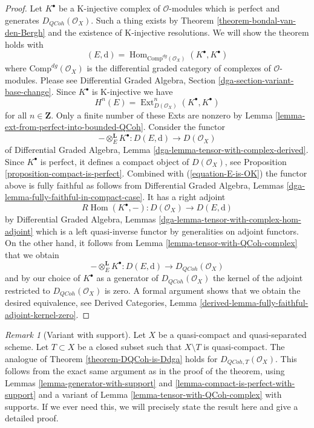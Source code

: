 \documentclass{stacks-project}
\theoremstyle{plain}
\theoremstyle{definition}
\theoremstyle{remark}
\newtheorem{remark}[subsection]{Remark}
\numberwithin{equation}{subsection}
\def\Hom{\mathop{\mathrm{Hom}}\nolimits}
\def\Ext{\mathop{\mathrm{Ext}}\nolimits}
\def\QCoh{\mathit{QCoh}}
\begin{document}
\begin{proof}
Let $K^\bullet$ be a K-injective complex of $\mathcal{O}$-modules which
is perfect and generates $D_\QCoh(\mathcal{O}_X)$. Such a
thing exists by Theorem \ref{theorem-bondal-van-den-Bergh}
and the existence of K-injective resolutions. We will show the
theorem holds with
$$
(E, \text{d}) = \Hom_{\text{Comp}^{dg}(\mathcal{O}_X)}(K^\bullet, K^\bullet)
$$
where $\text{Comp}^{dg}(\mathcal{O}_X)$ is the differential graded category
of complexes of $\mathcal{O}$-modules. Please see
Differential Graded Algebra, Section \ref{dga-section-variant-base-change}.
Since $K^\bullet$ is K-injective we
have
\begin{equation}
\label{equation-E-is-OK}
H^n(E) = \Ext^n_{D(\mathcal{O}_X)}(K^\bullet, K^\bullet)
\end{equation}
for all $n \in \mathbf{Z}$. Only a finite number of these Exts
are nonzero by Lemma \ref{lemma-ext-from-perfect-into-bounded-QCoh}.
Consider the functor
$$
- \otimes_E^\mathbf{L} K^\bullet :
D(E, \text{d}) \longrightarrow D(\mathcal{O}_X)
$$
of
Differential Graded Algebra, Lemma
\ref{dga-lemma-tensor-with-complex-derived}.
Since $K^\bullet$ is perfect, it defines a compact object of
$D(\mathcal{O}_X)$, see Proposition \ref{proposition-compact-is-perfect}.
Combined with (\ref{equation-E-is-OK}) the functor above is fully
faithful as follows from
Differential Graded Algebra, Lemmas
\ref{dga-lemma-fully-faithful-in-compact-case}. It has a right adjoint
$$
R\Hom(K^\bullet, - ) : D(\mathcal{O}_X) \longrightarrow D(E, \text{d})
$$
by Differential Graded Algebra, Lemmas
\ref{dga-lemma-tensor-with-complex-hom-adjoint}
which is a left quasi-inverse functor by generalities on adjoint
functors. On the other hand, it follows from
Lemma \ref{lemma-tensor-with-QCoh-complex} that we obtain
$$
- \otimes_E^\mathbf{L} K^\bullet :
D(E, \text{d}) \longrightarrow D_\QCoh(\mathcal{O}_X)
$$
and by our choice of $K^\bullet$ as a generator of
$D_\QCoh(\mathcal{O}_X)$ the kernel of the adjoint
restricted to $D_\QCoh(\mathcal{O}_X)$ is zero.
A formal argument shows that we obtain the desired equivalence, see
Derived Categories, Lemma
\ref{derived-lemma-fully-faithful-adjoint-kernel-zero}.
\end{proof}

\begin{remark}[Variant with support]
\label{remark-DQCoh-is-Ddga-with-support}
Let $X$ be a quasi-compact and quasi-separated scheme. Let $T \subset X$
be a closed subset such that $X \setminus T$ is quasi-compact.
The analogue of Theorem \ref{theorem-DQCoh-is-Ddga} holds
for $D_{\QCoh, T}(\mathcal{O}_X)$.
This follows from the exact same argument as in the proof
of the theorem, using
Lemmas \ref{lemma-generator-with-support} and
\ref{lemma-compact-is-perfect-with-support}
and a variant of Lemma \ref{lemma-tensor-with-QCoh-complex}
with supports.
If we ever need this, we will precisely state the
result here and give a detailed proof.
\end{remark}
\end{document}
